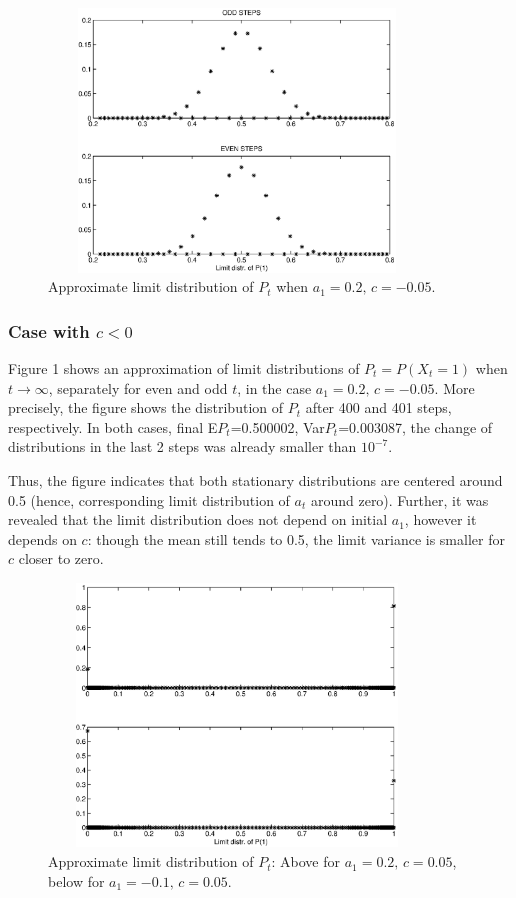 \documentclass[11pt]{article}
\begin{document}
\begin{figure}[h]
\centering
    \includegraphics[width = 10cm,height=7cm]{vyvoj_s_punish.eps}
\caption{Approximate limit distribution of $P_t$ when $a_1=0.2,\,
c=-0.05$.}
\end{figure}

\subsubsection{Case with $c<0$}

Figure 1 shows an approximation of limit distributions of $P_t =P(X_t=1)$ when $t\to\infty$, separately for 
even and odd $t$, in the case $a_1=0.2,\, c=-0.05$. More precisely, the figure shows the distribution of $P_t$ after
400 and 401 steps, respectively. In both cases, final E$P_t$=0.500002, Var$P_t$=0.003087, the change of distributions in the last 2 steps was already smaller than $10^{-7}$.

Thus, the figure indicates that both stationary distributions are centered around 0.5 
(hence, corresponding limit distribution of $a_t$ around zero). Further, 
it was revealed that the limit distribution does not depend on
initial $a_1$, however it depends on $c$: though the mean still tends to 0.5,
the limit variance is smaller for $c$ closer to zero.

\begin{figure}[h]
\centering
    \includegraphics[width = 10cm,height=7cm]{vyvoj_s_reward.eps}
\caption{Approximate limit distribution of $P_t$: Above for
$a_1=0.2,\, c=0.05$, below for $a_1=-0.1,\, c=0.05$.}
\end{figure}
\end{document}
